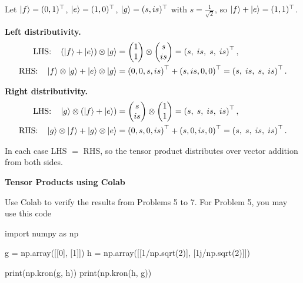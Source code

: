 \documentclass[a4paper, 10pt]{article}
\begin{document}
\begin{solution}
	\noindent Let \( \ket{f} = (0,1)^{\top} \), \( \ket{e} = (1,0)^{\top} \), \( \ket{g} = (s, is)^{\top} \) with \( s = \tfrac{1}{\sqrt{2}} \), so \( \ket{f} + \ket{e} = (1,1)^{\top} \).

	\noindent \textbf{Left distributivity.}
	\begin{align*}
		\text{LHS:}\quad \left(\ket{f} + \ket{e}\right) \otimes \ket{g}
		 & = \begin{pmatrix} 1 \\ 1 \end{pmatrix} \otimes \begin{pmatrix} s \\ is \end{pmatrix}
		= \left(s,\; is,\; s,\; is\right)^{\top},                                                    \\
		\text{RHS:}\quad \ket{f}\otimes\ket{g} + \ket{e}\otimes\ket{g}
		 & = \left(0, 0, s, is\right)^{\top} + \left(s, is, 0, 0\right)^{\top}
		= \left(s,\; is,\; s,\; is\right)^{\top}.
	\end{align*}

	\noindent \textbf{Right distributivity.}
	\begin{align*}
		\text{LHS:}\quad \ket{g} \otimes \left(\ket{f} + \ket{e}\right)
		 & = \begin{pmatrix} s \\ is \end{pmatrix} \otimes \begin{pmatrix} 1 \\ 1 \end{pmatrix}
		= \left(s,\; s,\; is,\; is\right)^{\top},                                                    \\
		\text{RHS:}\quad \ket{g}\otimes\ket{f} + \ket{g}\otimes\ket{e}
		 & = \left(0, s, 0, is\right)^{\top} + \left(s, 0, is, 0\right)^{\top}
		= \left(s,\; s,\; is,\; is\right)^{\top}.
	\end{align*}

	\noindent In each case LHS \( = \) RHS, so the tensor product distributes over vector addition from both sides.
\end{solution}

\begin{problem}
\textbf{Tensor Products using Colab}
\par Use Colab to verify the results from Problems 5 to 7.
For Problem 5, you may use this code
\begin{codingbox}
import numpy as np

g = np.array([[0], [1]])
h = np.array([[1/np.sqrt(2)], [1j/np.sqrt(2)]])

print(np.kron(g, h))
print(np.kron(h, g))
\end{codingbox}
\end{problem}
\end{document}
